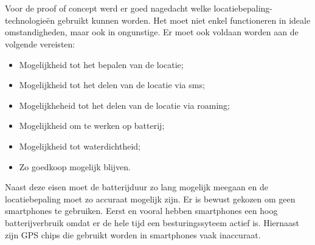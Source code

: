 \chapter{}
\label{ch:vergelijking}
Voor de proof of concept werd er goed nagedacht welke locatiebepaling-technologieën gebruikt kunnen worden. Het moet niet enkel functioneren in ideale omstandigheden, maar ook in ongunstige. Er moet ook voldaan worden aan de volgende vereisten:
\begin{itemize}
    \item Mogelijkheid tot het bepalen van de locatie;
    \item Mogelijkheid tot het delen van de locatie via sms;
    \item Mogelijkheheid tot het delen van de locatie via roaming;
    \item Mogelijkheid om te werken op batterij;
    \item Mogelijkheid tot waterdichtheid;
    \item Zo goedkoop mogelijk blijven.
\end{itemize}
Naast deze eisen moet de batterijduur zo lang mogelijk meegaan en de locatiebepaling moet zo accuraat mogelijk zijn.
\newline
Er is bewust gekozen om geen smartphones te gebruiken. Eerst en vooral hebben smartphones een hoog batterijverbruik omdat er de hele tijd een besturingssyteem actief is. Hiernaast zijn GPS chips die gebruikt worden in smartphones vaak inaccuraat.
\newline
